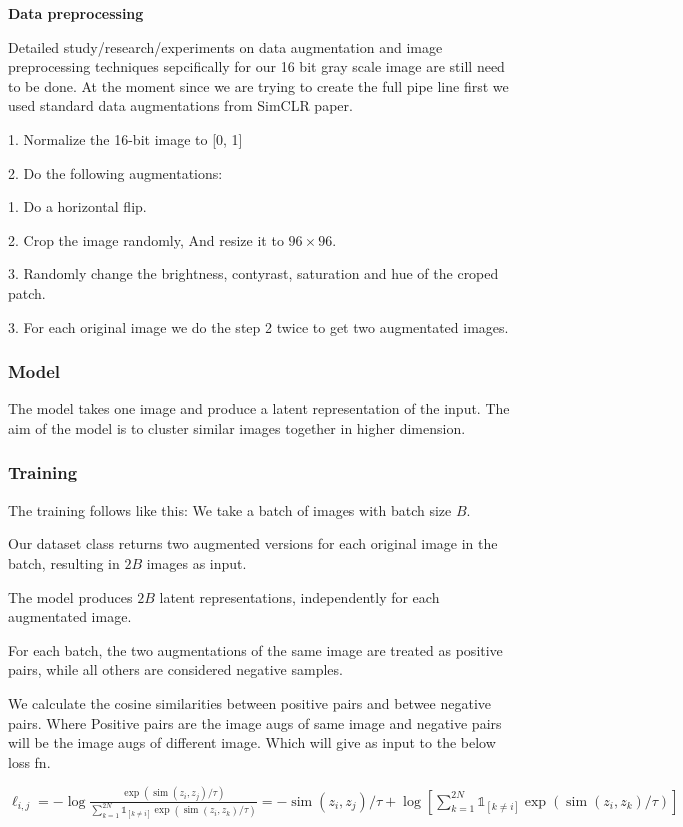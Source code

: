 \documentclass[12pt,twoside,a4paper,parskip]{scrbook} %
\begin{document}
\textbf{Data preprocessing}

Detailed study/research/experiments on data augmentation and image preprocessing techniques sepcifically for our 16 bit gray scale image are still need to be done.
At the moment since we are trying to create the full pipe line first we used standard data augmentations from SimCLR paper.

1. Normalize the 16-bit image to [0, 1]

2. Do the following augmentations:

      1. Do a horizontal flip.

      2. Crop the image randomly, And resize it to $96\times 96$.

      3. Randomly change the brightness, contyrast, saturation and hue of the croped patch.

3. For each original image we do the step 2 twice to get two augmentated images.

\subsubsection{Model}
The model takes one image and produce a latent representation of the input. The aim of the model is to cluster similar images together in higher dimension.
\subsubsection{Training}
The training follows like this:
  We take a batch of images with batch size $B$.

  Our dataset class returns two augmented versions for each original image in the batch, resulting in $2B$ images as input.

  The model produces $2B$ latent representations, independently for each augmentated image.

  For each batch, the two augmentations of the same image are treated as positive pairs, while all others are considered negative samples.

  We calculate the cosine similarities between positive pairs and betwee  negative pairs. Where Positive pairs are the image augs of same image and negative pairs will be the image augs of different image. Which will give as input to the below loss fn. 

\( \ell_{i, j}=-\log \frac{\exp \left(\operatorname{sim}\left(z_{i}, z_{j}\right) / \tau\right)}{\sum_{k=1}^{2 N} \mathbb{1}_{[k \neq i]} \exp \left(\operatorname{sim}\left(z_{i}, z_{k}\right) / \tau\right)}=-\operatorname{sim}\left(z_{i}, z_{j}\right) / \tau+\log \left[\sum_{k=1}^{2 N} \mathbb{1}_{[k \neq i]} \exp \left(\operatorname{sim}\left(z_{i}, z_{k}\right) / \tau\right)\right] \)
\end{document}
